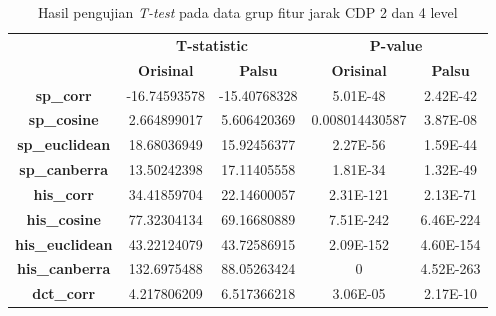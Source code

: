 \begin{table}[!ht]
	\centering
	\caption{Hasil pengujian \emph{T-test} pada data grup fitur jarak CDP 2 dan 4 level}
	\vspace{0.5em}
	\begin{tabular}{|c|cc|cc|}
		\hline
		\multirow{2}{*}{}       & \multicolumn{2}{c|}{\textbf{T-statistic}} & \multicolumn{2}{c|}{\textbf{P-value}}                                                           \\ \cline{2-5}
		                        & \multicolumn{1}{c|}{\textbf{Orisinal}}    & \textbf{Palsu}                        & \multicolumn{1}{c|}{\textbf{Orisinal}} & \textbf{Palsu} \\ \hline
		\textbf{sp\_corr}       & \multicolumn{1}{c|}{-16.74593578}         & -15.40768328                          & \multicolumn{1}{c|}{5.01E-48}          & 2.42E-42       \\ \hline
		\textbf{sp\_cosine}     & \multicolumn{1}{c|}{2.664899017}          & 5.606420369                           & \multicolumn{1}{c|}{0.008014430587}    & 3.87E-08       \\ \hline
		\textbf{sp\_euclidean}  & \multicolumn{1}{c|}{18.68036949}          & 15.92456377                           & \multicolumn{1}{c|}{2.27E-56}          & 1.59E-44       \\ \hline
		\textbf{sp\_canberra}   & \multicolumn{1}{c|}{13.50242398}          & 17.11405558                           & \multicolumn{1}{c|}{1.81E-34}          & 1.32E-49       \\ \hline
		\textbf{his\_corr}      & \multicolumn{1}{c|}{34.41859704}          & 22.14600057                           & \multicolumn{1}{c|}{2.31E-121}         & 2.13E-71       \\ \hline
		\textbf{his\_cosine}    & \multicolumn{1}{c|}{77.32304134}          & 69.16680889                           & \multicolumn{1}{c|}{7.51E-242}         & 6.46E-224      \\ \hline
		\textbf{his\_euclidean} & \multicolumn{1}{c|}{43.22124079}          & 43.72586915                           & \multicolumn{1}{c|}{2.09E-152}         & 4.60E-154      \\ \hline
		\textbf{his\_canberra}  & \multicolumn{1}{c|}{132.6975488}          & 88.05263424                           & \multicolumn{1}{c|}{0}                 & 4.52E-263      \\ \hline
		\textbf{dct\_corr}      & \multicolumn{1}{c|}{4.217806209}          & 6.517366218                           & \multicolumn{1}{c|}{3.06E-05}          & 2.17E-10       \\ \hline

\end{tabular}
\end{table}
